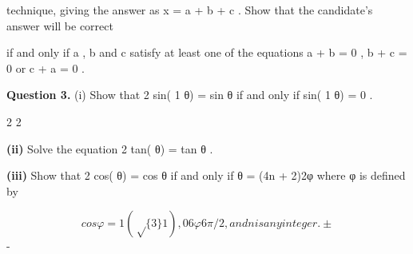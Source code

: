 \documentclass[12pt]{article}
\begin{document}
\begin{flushleft}
technique, giving the answer as x = a + b + c . Show that the candidate's answer will be correct\par
if and only if a , b and c satisfy at least one of the equations a + b = 0 , b + c = 0 or c + a = 0 .\par
\bigskip\textbf{Question 3.} (i) Show that 2 sin( 1 θ) = sin θ if and only if sin( 1 θ) = 0 .\par
2 2\par
\textbf{(ii)} Solve the equation 2 tan( θ) = tan θ .\par
\textbf{(iii)} Show that 2 cos( θ) = cos θ if and only if θ = (4n + 2)\pi 2φ where φ is defined by\par
\[cos φ = 1 (\sqrt\{3\} 1) , 0 6 φ 6 \pi/2, and n is any integer. ±\]
-\par
\end{flushleft}
\end{document}
